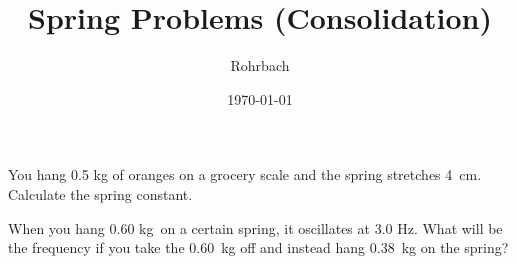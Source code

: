 \documentclass[10pt]{exam}
\title{Spring Problems (Consolidation)}
\author{Rohrbach}
\date{\today}
\begin{document}
\maketitle

\begin{questions}
  
  \question
    You hang 0.5 kg of oranges on a grocery scale and the spring stretches 4~cm. Calculate the spring constant.
    \vs

  \question
    When you hang 0.60 kg~on a certain spring, it oscillates at 3.0 Hz. What will be the frequency if you take the 0.60~kg off and instead hang 0.38~kg on the spring?
    \vs

\end{questions}
\end{document}
